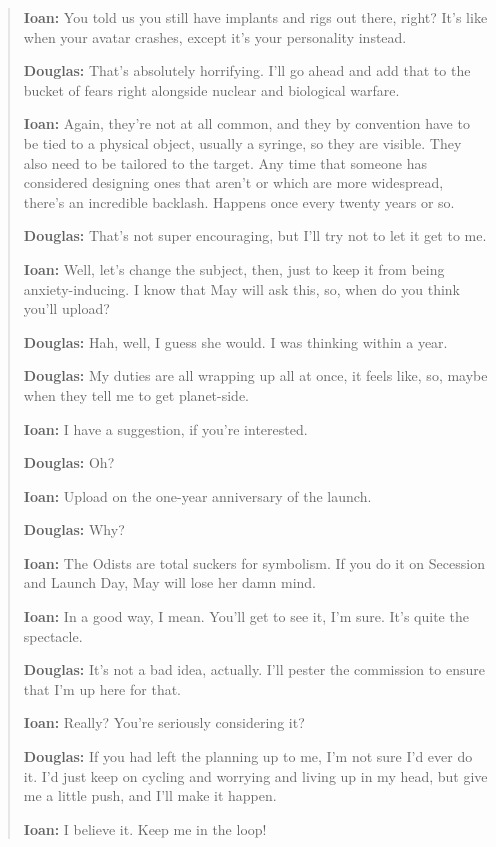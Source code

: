 \begin{quote}
\textbf{Ioan:} You told us you still have implants and rigs out there, right? It's like when your avatar crashes, except it's your personality instead.

\textbf{Douglas:} That's absolutely horrifying. I'll go ahead and add that to the bucket of fears right alongside nuclear and biological warfare.

\textbf{Ioan:} Again, they're not at all common, and they by convention have to be tied to a physical object, usually a syringe, so they are visible. They also need to be tailored to the target. Any time that someone has considered designing ones that aren't or which are more widespread, there's an incredible backlash. Happens once every twenty years or so.

\textbf{Douglas:} That's not super encouraging, but I'll try not to let it get to me.

\textbf{Ioan:} Well, let's change the subject, then, just to keep it from being anxiety-inducing. I know that May will ask this, so, when do you think you'll upload?

\textbf{Douglas:} Hah, well, I guess she would. I was thinking within a year.

\textbf{Douglas:} My duties are all wrapping up all at once, it feels like, so, maybe when they tell me to get planet-side.

\textbf{Ioan:} I have a suggestion, if you're interested.

\textbf{Douglas:} Oh?

\textbf{Ioan:} Upload on the one-year anniversary of the launch.

\textbf{Douglas:} Why?

\textbf{Ioan:} The Odists are total suckers for symbolism. If you do it on Secession and Launch Day, May will lose her damn mind.

\textbf{Ioan:} In a good way, I mean. You'll get to see it, I'm sure. It's quite the spectacle.

\textbf{Douglas:} It's not a bad idea, actually. I'll pester the commission to ensure that I'm up here for that.

\textbf{Ioan:} Really? You're seriously considering it?

\textbf{Douglas:} If you had left the planning up to me, I'm not sure I'd ever do it. I'd just keep on cycling and worrying and living up in my head, but give me a little push, and I'll make it happen.

\textbf{Ioan:} I believe it. Keep me in the loop!


\end{quote}
